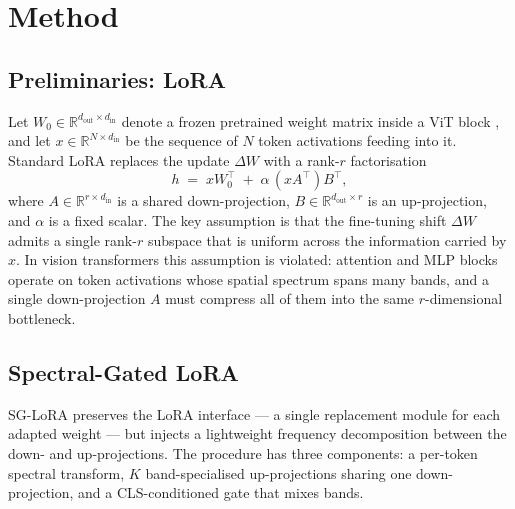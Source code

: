 \documentclass{article}
\begin{document}
\section{Method}
\subsection{Preliminaries: LoRA}

Let $W_0 \in \mathbb{R}^{d_{\text{out}} \times d_{\text{in}}}$ denote a frozen pretrained weight matrix inside a ViT block \citep{dosovitskiy2021vit}, and let $x \in \mathbb{R}^{N \times d_{\text{in}}}$ be the sequence of $N$ token activations feeding into it. Standard LoRA \citep{hu2022lora} replaces the update $\Delta W$ with a rank-$r$ factorisation
\begin{equation}
h \;=\; x W_0^{\top} \;+\; \alpha \, (x A^{\top}) B^{\top},
\end{equation}
where $A \in \mathbb{R}^{r \times d_{\text{in}}}$ is a shared down-projection, $B \in \mathbb{R}^{d_{\text{out}} \times r}$ is an up-projection, and $\alpha$ is a fixed scalar. The key assumption is that the fine-tuning shift $\Delta W$ admits a single rank-$r$ subspace that is uniform across the information carried by $x$. In vision transformers this assumption is violated: attention and MLP blocks operate on token activations whose spatial spectrum spans many bands, and a single down-projection $A$ must compress all of them into the same $r$-dimensional bottleneck.

\subsection{Spectral-Gated LoRA}

SG-LoRA preserves the LoRA interface — a single replacement module for each adapted weight — but injects a lightweight frequency decomposition between the down- and up-projections. The procedure has three components: a per-token spectral transform, $K$ band-specialised up-projections sharing one down-projection, and a CLS-conditioned gate that mixes bands.
\end{document}
